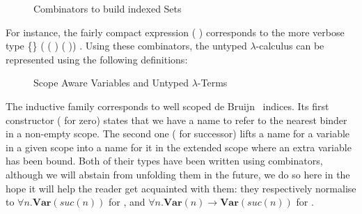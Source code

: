 \begin{figure}[h]
\begin{minipage}{0.45\textwidth}
\end{minipage}\hspace{2em}
\begin{minipage}{0.45\textwidth}
\end{minipage}

\begin{minipage}{0.25\textwidth}
\end{minipage}
\begin{minipage}{0.40\textwidth}
\end{minipage}\hspace{2em}
\begin{minipage}{0.25\textwidth}
\end{minipage}
\caption{Combinators to build indexed Sets}\label{figure:indexed}
\end{figure}

For instance, the fairly compact expression
\AF{[}   (  )   \AF{]}
corresponds to the more verbose type
 \{\}  ( ( )   ( ))   .
Using these combinators, the untyped $\lambda$-calculus can be represented
using the following definitions:

\begin{figure}[h]
\begin{minipage}{0.45\textwidth}
\end{minipage}\hspace{2em}
\begin{minipage}{0.45\textwidth}
\end{minipage}
\caption{Scope Aware Variables and Untyped $\lambda$-Terms\label{scoped-untyped}}
\end{figure}

The inductive family  corresponds to well scoped de Bruijn~\citeyear{de1972lambda}
indices. Its first constructor ( for zero) states that we have a name to refer to
the nearest binder in a non-empty scope. The second one ( for successor) lifts a
name for a variable in a given scope into a name for it in the extended scope where
an extra variable has been bound. Both of their types have been written using combinators,
although we will abstain from unfolding them in the future, we do so here in the hope
it will help the reader get acquainted with them: they respectively normalise to
$\forall n. \mathbf{Var}(\mathit{suc}(n))$ for ,
and $\forall n. \mathbf{Var}(n) \rightarrow \mathbf{Var}(\mathit{suc}(n))$ for .

